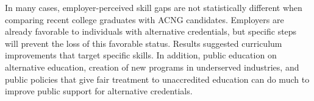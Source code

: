 \documentclass[review]{elsarticle}
\begin{document}
In many cases, employer-perceived skill gaps are not statistically different when comparing recent college graduates with ACNG candidates.
Employers are already favorable to individuals with alternative credentials,
but specific steps will prevent the loss of this favorable status.
Results suggested curriculum improvements that target specific skills.
In addition, public education on alternative education,
creation of new programs in underserved industries,
and public policies that give fair treatment to unaccredited education
can do much to improve public support for alternative credentials.



\end{document}
